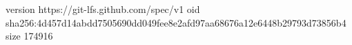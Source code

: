 version https://git-lfs.github.com/spec/v1
oid sha256:4d457d14abdd7505690dd049fee8e2afd97aa68676a12e6448b29793d73856b4
size 174916
